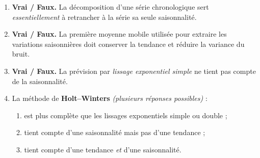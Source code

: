 \documentclass[11pt]{article}
\begin{document}
\begin{enumerate}[label=\textbf{Q\,A.\arabic*},leftmargin=*]
\item \textbf{Vrai / Faux.} La décomposition d'une série chronologique sert \emph{essentiellement}
à retrancher à la série sa seule saisonnalité.

\item \textbf{Vrai / Faux.} La première moyenne mobile utilisée pour extraire les variations
saisonnières doit conserver la tendance et réduire la variance du bruit.

\item \textbf{Vrai / Faux.} La prévision par \emph{lissage exponentiel simple} ne tient pas
compte de la saisonnalité.

\item La méthode de \textbf{Holt--Winters} \emph{(plusieurs réponses possibles)} :
\begin{enumerate}[label=\Alph*.,nosep]
  \item est plus complète que les lissages exponentiels simple ou double ;
  \item tient compte d'une saisonnalité mais pas d'une tendance ;
  \item tient compte d'une tendance \emph{et} d'une saisonnalité.
\end{enumerate}
\end{enumerate}
\end{document}
